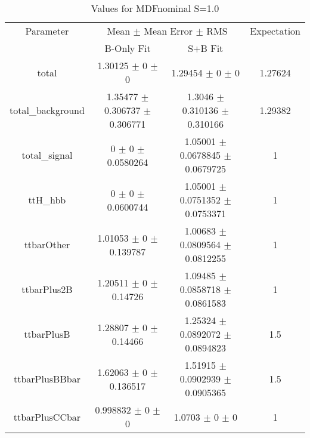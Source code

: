 \begin{table}
\centering
\caption{Values for MDFnominal S=1.0}
\begin{tabular}{cccc}
\toprule
Parameter & \multicolumn{2}{c}{Mean $\pm$ Mean Error $\pm$ RMS} & Expectation\\
 & B-Only Fit & S+B Fit & \\
\midrule
total & \num{1.30125} $\pm$ \num{0} $\pm$ \num{0} & \num{1.29454} $\pm$ \num{0} $\pm$ \num{0} & \num{1.27624}\\
total\_background & \num{1.35477} $\pm$ \num{0.306737} $\pm$ \num{0.306771} & \num{1.3046} $\pm$ \num{0.310136} $\pm$ \num{0.310166} & \num{1.29382}\\
total\_signal & \num{0} $\pm$ \num{0} $\pm$ \num{0.0580264} & \num{1.05001} $\pm$ \num{0.0678845} $\pm$ \num{0.0679725} & \num{1}\\
ttH\_hbb & \num{0} $\pm$ \num{0} $\pm$ \num{0.0600744} & \num{1.05001} $\pm$ \num{0.0751352} $\pm$ \num{0.0753371} & \num{1}\\
ttbarOther & \num{1.01053} $\pm$ \num{0} $\pm$ \num{0.139787} & \num{1.00683} $\pm$ \num{0.0809564} $\pm$ \num{0.0812255} & \num{1}\\
ttbarPlus2B & \num{1.20511} $\pm$ \num{0} $\pm$ \num{0.14726} & \num{1.09485} $\pm$ \num{0.0858718} $\pm$ \num{0.0861583} & \num{1}\\
ttbarPlusB & \num{1.28807} $\pm$ \num{0} $\pm$ \num{0.14466} & \num{1.25324} $\pm$ \num{0.0892072} $\pm$ \num{0.0894823} & \num{1.5}\\
ttbarPlusBBbar & \num{1.62063} $\pm$ \num{0} $\pm$ \num{0.136517} & \num{1.51915} $\pm$ \num{0.0902939} $\pm$ \num{0.0905365} & \num{1.5}\\
ttbarPlusCCbar & \num{0.998832} $\pm$ \num{0} $\pm$ \num{0} & \num{1.0703} $\pm$ \num{0} $\pm$ \num{0} & \num{1}\\
\bottomrule
\end{tabular}
\end{table}